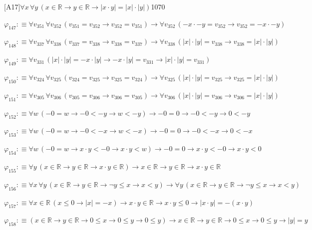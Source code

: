 \begin{fullproof}{[A17]}{$\forall x\,\forall y\,(x \in \mathbb{R} \to y \in \mathbb{R} \to \lvert x \cdot y \rvert = \lvert x \rvert \cdot \lvert y \rvert)$}{1070}
\begin{abbrevlist}
\item $\varphi_{147} :\equiv \forall v_{351}\,\forall v_{352}\,(v_{351} = v_{352} \to v_{352} = v_{351}) \to \forall v_{352}\,(-x \cdot -y = v_{352} \to v_{352} = -x \cdot -y)$
\item $\varphi_{148} :\equiv \forall v_{337}\,\forall v_{338}\,(v_{337} = v_{338} \to v_{338} = v_{337}) \to \forall v_{338}\,(\lvert x \rvert \cdot \lvert y \rvert = v_{338} \to v_{338} = \lvert x \rvert \cdot \lvert y \rvert)$
\item $\varphi_{149} :\equiv \forall v_{331}\,(\lvert x \rvert \cdot \lvert y \rvert = -x \cdot \lvert y \rvert \to -x \cdot \lvert y \rvert = v_{331} \to \lvert x \rvert \cdot \lvert y \rvert = v_{331})$
\item $\varphi_{150} :\equiv \forall v_{324}\,\forall v_{325}\,(v_{324} = v_{325} \to v_{325} = v_{324}) \to \forall v_{325}\,(\lvert x \rvert \cdot \lvert y \rvert = v_{325} \to v_{325} = \lvert x \rvert \cdot \lvert y \rvert)$
\item $\varphi_{151} :\equiv \forall v_{305}\,\forall v_{306}\,(v_{305} = v_{306} \to v_{306} = v_{305}) \to \forall v_{306}\,(\lvert x \rvert \cdot \lvert y \rvert = v_{306} \to v_{306} = \lvert x \rvert \cdot \lvert y \rvert)$
\item $\varphi_{152} :\equiv \forall w\,(-0 = w \to -0 < -y \to w < -y) \to -0 = 0 \to -0 < -y \to 0 < -y$
\item $\varphi_{153} :\equiv \forall w\,(-0 = w \to -0 < -x \to w < -x) \to -0 = 0 \to -0 < -x \to 0 < -x$
\item $\varphi_{154} :\equiv \forall w\,(-0 = w \to x \cdot y < -0 \to x \cdot y < w) \to -0 = 0 \to x \cdot y < -0 \to x \cdot y < 0$
\item $\varphi_{155} :\equiv \forall y\,(x \in \mathbb{R} \to y \in \mathbb{R} \to x \cdot y \in \mathbb{R}) \to x \in \mathbb{R} \to y \in \mathbb{R} \to x \cdot y \in \mathbb{R}$
\item $\varphi_{156} :\equiv \forall x\,\forall y\,(x \in \mathbb{R} \to y \in \mathbb{R} \to \neg y \leq x \to x < y) \to \forall y\,(x \in \mathbb{R} \to y \in \mathbb{R} \to \neg y \leq x \to x < y)$
\item $\varphi_{157} :\equiv \forall x \in \mathbb{R}\,(x \leq 0 \to \lvert x \rvert = -x) \to x \cdot y \in \mathbb{R} \to x \cdot y \leq 0 \to \lvert x \cdot y \rvert = -(x \cdot y)$
\item $\varphi_{158} :\equiv (x \in \mathbb{R} \to y \in \mathbb{R} \to 0 \leq x \to 0 \leq y \to 0 \leq y) \to x \in \mathbb{R} \to y \in \mathbb{R} \to 0 \leq x \to 0 \leq y \to \lvert y \rvert = y$

\end{abbrevlist}
\end{fullproof}
